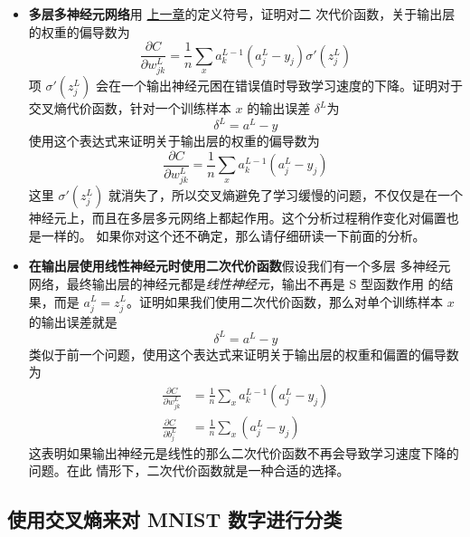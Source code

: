 \begin{itemize}
\item \textbf{多层多神经元网络}\quad 用%
  \hyperref[ch:HowTheBackpropagationAlgorithmWorks]{上一章}的定义符号，证明对二
  次代价函数，关于输出层的权重的偏导数为
  \begin{equation}
    \frac{\partial C}{\partial w^L_{jk}} = \frac{1}{n}
    \sum_x a^{L-1}_k  (a^L_j-y_j) \sigma'(z^L_j)
    \label{eq:65}\tag{65}
  \end{equation}
  项 $\sigma'(z^L_j)$ 会在一个输出神经元困在错误值时导致学习速度的下降。证明对于
  交叉熵代价函数，针对一个训练样本 $x$ 的输出误差 $\delta^L$为
  \begin{equation}
    \delta^L = a^L-y
    \label{eq:66}\tag{66}
  \end{equation}
  使用这个表达式来证明关于输出层的权重的偏导数为
  \begin{equation}
    \frac{\partial C}{\partial w^L_{jk}} = \frac{1}{n} \sum_x
    a^{L-1}_k  (a^L_j-y_j)
    \label{eq:67}\tag{67}
  \end{equation}
  这里 $\sigma'(z^L_j)$ 就消失了，所以交叉熵避免了学习缓慢的问题，不仅仅是在一个
  神经元上，而且在多层多元网络上都起作用。这个分析过程稍作变化对偏置也是一样的。
  如果你对这个还不确定，那么请仔细研读一下前面的分析。
\item \textbf{在输出层使用线性神经元时使用二次代价函数}\quad 假设我们有一个多层
  多神经元网络，最终输出层的神经元都是\emph{线性神经元}，输出不再是 S 型函数作用
  的结果，而是 $a^L_j = z^L_j$。证明如果我们使用二次代价函数，那么对单个训练样本
  $x$ 的输出误差就是
  \begin{equation}
    \delta^L = a^L-y
    \label{eq:68}\tag{68}
  \end{equation}
  类似于前一个问题，使用这个表达式来证明关于输出层的权重和偏置的偏导数为
  \begin{align}
    \frac{\partial C}{\partial w^L_{jk}} &= \frac{1}{n} \sum_x
                                           a^{L-1}_k  (a^L_j-y_j) \label{eq:69}\tag{69}\\
    \frac{\partial C}{\partial b^L_{j}} &= \frac{1}{n} \sum_x
                                          (a^L_j-y_j) \label{eq:70}\tag{70}
  \end{align}
  这表明如果输出神经元是线性的那么二次代价函数不再会导致学习速度下降的问题。在此
  情形下，二次代价函数就是一种合适的选择。
\end{itemize}

\subsection{使用交叉熵来对 MNIST 数字进行分类}


